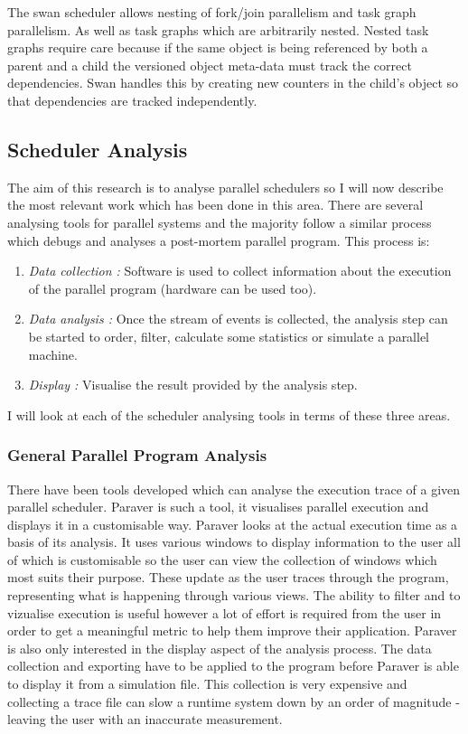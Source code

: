 The swan scheduler allows nesting of fork/join parallelism and task graph parallelism. As well as task graphs which are arbitrarily nested. Nested task graphs require care because if the same object is being referenced by both a parent and a child the versioned object meta-data must track the correct dependencies. Swan handles this by creating new counters in the child's object so that dependencies are tracked independently.

\subsection{Scheduler Analysis}

The aim of this research is to analyse parallel schedulers so I will now describe the most relevant work which has been done in this area. There are several analysing tools for parallel systems and the majority follow a similar process which debugs and analyses a post-mortem parallel program. This process is:

\begin{enumerate}
	\item
		\emph{Data collection :} Software is used to collect information about the execution of the parallel program (hardware can be used too).
	\item
		\emph{Data analysis :} Once the stream of events is collected, the analysis step can be started to order, filter, calculate some statistics or simulate a parallel machine.
	\item
		\emph{Display :} Visualise the result provided by the analysis step. 
\end{enumerate}

I will look at each of the scheduler analysing tools in terms of these three areas.

\subsubsection{General Parallel Program Analysis}
There have been tools developed which can analyse the execution trace of a given parallel scheduler. Paraver is such a tool, it visualises parallel execution and displays it in a customisable way. Paraver looks at the actual execution time as a basis of its analysis.  It uses various windows to display information to the user all of which is customisable so the user can view the collection of windows which most suits their purpose. These update as the user traces through the program, representing what is happening through various views. The ability to filter and to vizualise execution is useful however a lot of effort is required from the user in order to get a meaningful metric to help them improve their application. Paraver is also only interested in the display aspect of the analysis process. The data collection and exporting have to be applied to the program before Paraver is able to display it from a simulation file. This collection is very expensive and collecting a trace file can slow a runtime system down by an order of magnitude - leaving the user with an inaccurate measurement.

